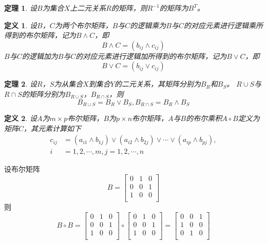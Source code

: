 \documentclass{article}
\newtheorem{Def}{定义}
\newtheorem{Thm}{定理}
\begin{document}
\begin{CJK*}{UTF8}{gbsn}
  \begin{Thm}
    设$B$为集合$X$上二元关系$R$的矩阵，则$R^{-1}$的矩阵为$B^{T}$。
  \end{Thm}


   \begin{Def}
    设$B$，$C$为两个布尔矩阵，$B$与$C$的逻辑乘为$B$与$C$的对应元素进行逻辑乘所得到的布尔矩阵，记为$B \land C$，即
    \begin{equation*}
      B \land C = (b_{ij} \land c_{ij})
    \end{equation*}
    $B$与$C$的逻辑加为$B$与$C$的对应元素进行逻辑加所得到的布尔矩阵，记为$B \lor C$，即
    \begin{equation*}
      B \lor C = (b_{ij} \lor c_{ij})
    \end{equation*}
  \end{Def}
  \begin{Thm}
    设$R$，$S$为从集合$X$到集合$Y$的二元关系，其矩阵分别为$B_R$和$B_S$。 $R\cup S$与$R \cap S$的矩阵分别为$B_{R\cup S}$，$B_{R\cap S}$，则
    \begin{equation*}
      B_{R\cup S}=B_R \lor B_S, B_{R\cap S}=B_R \land B_S
    \end{equation*}
  \end{Thm}
  \begin{Def}
    设$A$为$m\times p$布尔矩阵，$B$为$p \times n$布尔矩阵，$A$与$B$的布尔乘积$A \circ B$定义为矩阵$C$，其元素计算如下
    \begin{align*}
      c_{ij} &= (a_{i1}\land b_{1j}) \lor (a_{i2} \land b_{2j}) \lor \cdots \lor (a_{ip} \land b_{pj}), \\
      i &= 1,2,\cdots, m, j = 1,2,\cdots, n
    \end{align*}
  \end{Def}
  设布尔矩阵
  \[B=\begin{bmatrix}
    0&1&0\\
    0&0&1\\
    1&0&0\\
  \end{bmatrix}
\]
则
\[B\circ B=\begin{bmatrix}
  0&1&0\\
  0&0&1\\
  1&0&0\\
\end{bmatrix}
\circ
\begin{bmatrix}
  0&1&0\\
  0&0&1\\
  1&0&0\\
\end{bmatrix}
=\begin{bmatrix}
  0&0&1\\
  1&0&0\\
  0&1&0\\
\end{bmatrix}\]


\end{CJK*}
\end{document}
